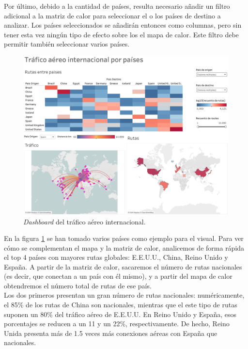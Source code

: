 \documentclass[11pt]{opticajnl}
\begin{document}
Por último, debido a la cantidad de países, resulta necesario añadir un filtro adicional a la matriz de calor para seleccionar el o los países de destino a analizar. Los países seleccionados se añadirán entonces como columnas, pero sin tener esta vez ningún tipo de efecto sobre los el mapa de calor. Este filtro debe permitir también seleccionar varios países. \\

\begin{figure}[h]
\centering
\includegraphics[width=\textwidth]{fotos/4.png}
\caption{\textit{Dashboard} del tráfico aéreo internacional.}
\label{fig:4}
\end{figure}

En la figura \ref{fig:4} se han tomado varios países como ejemplo para el visual. Para ver cómo se complementan el mapa y la matriz de calor, analicemos de forma rápida el top 4 países con mayores rutas globales: E.E.U.U., China, Reino Unido y España. A partir de la matriz de calor, sacaremos el número de rutas nacionales (es decir, que conectan a un país con él mismo), y a partir del mapa de calor obtendremos el número total de rutas de ese país. \\

Los dos primeros presentan un gran número de rutas nacionales: numéricamente, el 85\% de los rutas de China son nacionales, mientras que el este tipo de rutas suponen un 80\% del tráfico aéreo de E.E.U.U. En Reino Unido y España, esos porcentajes se reducen a un 11 y un 22\%, respectivamente. De hecho, Reino Unida presenta más de 1.5 veces más conexiones aéreas con España que nacionales. 
\end{document}
